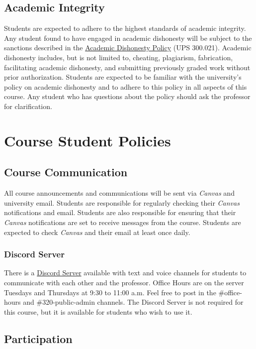 \documentclass[12pt, letterpaper]{article}
\begin{document}
\subsection*{Academic Integrity}
Students are expected to adhere to the highest standards of academic integrity. Any student found to have engaged in academic dishonesty will be subject to the sanctions described in the \href{https://www.fullerton.edu/senate/publications_policies_resolutions/ups/UPS%20300/UPS%20300.021.pdf}{Academic Dishonesty Policy} (UPS 300.021). Academic dishonesty includes, but is not limited to, cheating, plagiarism, fabrication, facilitating academic dishonesty, and submitting previously graded work without prior authorization. Students are expected to be familiar with the university's policy on academic dishonesty and to adhere to this policy in all aspects of this course. Any student who has questions about the policy should ask the professor for clarification.


\section*{Course Student Policies}

\subsection*{Course Communication}
All course announcements and communications will be sent via \emph{Canvas} and university email. Students are responsible for regularly checking their \emph{Canvas} notifications and email. Students are also responsible for ensuring that their \emph{Canvas} notifications are set to receive messages from the course. Students are expected to check \emph{Canvas} and their email at least once daily.

\subsubsection*{Discord Server}

There is a \href{https://discord.gg/pKjbtWydxm}{Discord Server} available with text and voice channels for students to communicate with each other and the professor. Office Hours are on the server Tuesdays and Thursdays at 9:30 to 11:00 a.m. Feel free to post in the \#office-hours and \#320-public-admin channels. The Discord Server is not required for this course, but it is available for students who wish to use it.

\subsection*{Participation}
\end{document}
